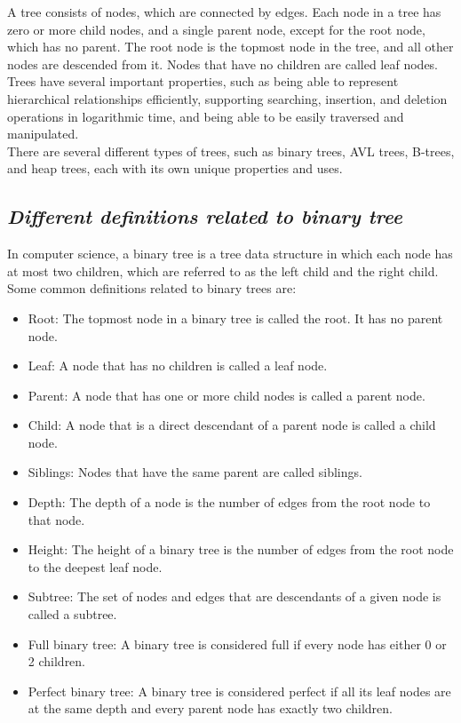 \documentclass{article}
\begin{document}
A tree consists of nodes, which are connected by edges. Each node in a tree has zero or more child nodes, and a single parent node, except for the root node, which has no parent. The root node is the topmost node in the tree, and all other nodes are descended from it. Nodes that have no children are called leaf nodes.\\

Trees have several important properties, such as being able to represent hierarchical relationships efficiently, supporting searching, insertion, and deletion operations in logarithmic time, and being able to be easily traversed and manipulated.\\

There are several different types of trees, such as binary trees, AVL trees, B-trees, and heap trees, each with its own unique properties and uses.
\subsection{\textit{Different definitions related to binary tree}}
In computer science, a binary tree is a tree data structure in which each node has at most two children, which are referred to as the left child and the right child. Some common definitions related to binary trees are:
\begin{itemize}
	\item Root: The topmost node in a binary tree is called the root. It has no parent node.
	\item Leaf: A node that has no children is called a leaf node.
	\item Parent: A node that has one or more child nodes is called a parent node.
	\item Child: A node that is a direct descendant of a parent node is called a child node.
	\item Siblings: Nodes that have the same parent are called siblings.
	\item Depth: The depth of a node is the number of edges from the root node to that node.
	\item Height: The height of a binary tree is the number of edges from the root node to the deepest leaf node.
	\item Subtree: The set of nodes and edges that are descendants of a given node is called a subtree.
	\item Full binary tree: A binary tree is considered full if every node has either 0 or 2 children.
	\item Perfect binary tree: A binary tree is considered perfect if all its leaf nodes are at the same depth and every parent node has exactly two children.
\end{itemize}
\end{document}
